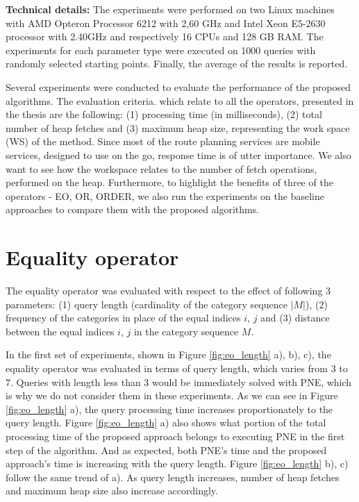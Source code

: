 \textbf{Technical details:}
The experiments were performed on two Linux machines with AMD Opteron Processor 6212 with 2,60 GHz and Intel Xeon E5-2630 processor with 2.40GHz and respectively 16 CPUs and 128 GB RAM. The experiments for each parameter type were executed on 1000 queries with randomly selected starting points. Finally, the average of the results is reported.

Several experiments were conducted to evaluate the performance of the proposed algorithms. The evaluation criteria. which relate to all the operators, presented in the thesis are the following: (1) processing time (in milliseconds), (2) total number of heap fetches and (3) maximum heap size, representing the work space (WS) of the method. Since most of the route planning services are mobile services, designed to use on the go, response time is of utter importance. We also want to see how the workspace relates to the number of fetch operations, performed on the heap. Furthermore, to highlight the benefits of three of the operators - EO, OR, ORDER, we also run the experiments on the baseline approaches to compare them with the proposed algorithms. 

\section{Equality operator}
\label{sec:experimentsEO}

The equality operator was evaluated with respect to the effect of following 3 parameters: (1) query length (cardinality of the category sequence $|M|$), (2) frequency of the categories in place of the equal indices $i$, $j$ and (3) distance between the equal indices $i$, $j$ in the category sequence $M$.

In the first set of experiments, shown in Figure \ref{fig:eo_length} a), b), c), the equality operator was evaluated in terms of query length, which varies from 3 to 7. Queries with length less than 3 would be immediately solved with PNE, which is why we do not consider them in these experiments. 
As we can see in Figure \ref{fig:eo_length} a), the query processing time increases proportionately to the query length. Figure \ref{fig:eo_length} a) also shows what portion of the total processing time of the proposed approach belongs to executing PNE in the first step of the algorithm. And as expected, both PNE's time and the proposed approach's time is increasing with the query length.
Figure \ref{fig:eo_length} b), c) follow the same trend of a). As query length increases, number of heap fetches and maximum heap size also increase accordingly.

